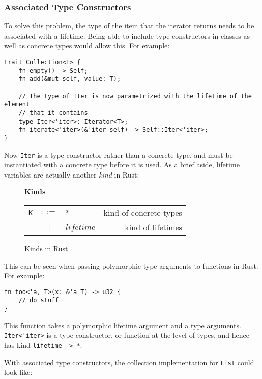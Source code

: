 \subsubsection{Associated Type Constructors}
To solve this problem, the type of the item that the iterator returns needs to
be associated with a lifetime. Being able to include type constructors in classes
as well as concrete types would allow this. For example:

\begin{lstlisting}[nolol]
trait Collection<T> {
    fn empty() -> Self;
    fn add(&mut self, value: T);

    // The type of Iter is now parametrized with the lifetime of the element
    // that it contains
    type Iter<'iter>: Iterator<T>;
    fn iterate<'iter>(&'iter self) -> Self::Iter<'iter>;
}
\end{lstlisting}

Now \lstinline{Iter} is a type constructor rather than a concrete type, and must
be instantiated with a concrete type before it is used. As a brief aside,
lifetime variables are actually another \textit{kind} in Rust:
\begin{figure}[H]
    \vspace{1cm}
    \textbf{Kinds} \\
    \begin{tabular}{l c p{3cm} r}
        \texttt{K} & $ ::= $ & $ * $ &      kind of concrete types \\
        & $ | $ & $ lifetime $ &            kind of lifetimes  \\
    \end{tabular}
    \caption{Kinds in Rust}
\end{figure}

This can be seen when passing polymorphic type arguments to functions in Rust.
For example:

\begin{lstlisting}[nolol]
fn foo<'a, T>(x: &'a T) -> u32 {
    // do stuff
}
\end{lstlisting}

This function takes a polymorphic lifetime argument and a type arguments.
\lstinline{Iter<'iter>} is a type constructor, or function at the level of
types, and hence has kind \lstinline[mathescape]{lifetime -> *}.

With associated type constructors, the collection implementation for \lstinline{List}
could look like:

